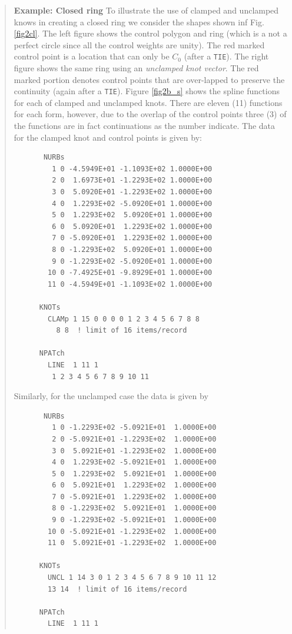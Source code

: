 \begin{quote}
\noindent
\textbf{Example: Closed ring}
To illustrate the use of clamped and unclamped knows in creating a closed
ring we consider the shapes shown inf Fig. \ref{fig2cl}.  The left figure
shows the control polygon and ring (which is a not a perfect circle since all
the control weights are unity). The red marked control point is a location that
can only be $C_0$ (after a \texttt{TIE}).  The right figure shows the same
ring using an \textit{unclamped knot vector}.  The red marked portion denotes
control points that are over-lapped to preserve the continuity (again after
a \texttt{TIE}).
Figure \ref{fig2b_s} shows the spline functions for each of clamped
and unclamped knots.  There are eleven (11) functions for each form, however,
due to the overlap of the control points three (3) of the functions are in
fact continuations as the number indicate.
The data for the clamped knot and control points is given
by:
\setlength{\baselineskip}{12pt}
\begin{verbatim}
       NURBs
         1 0 -4.5949E+01 -1.1093E+02 1.0000E+00
         2 0  1.6973E+01 -1.2293E+02 1.0000E+00
         3 0  5.0920E+01 -1.2293E+02 1.0000E+00
         4 0  1.2293E+02 -5.0920E+01 1.0000E+00
         5 0  1.2293E+02  5.0920E+01 1.0000E+00
         6 0  5.0920E+01  1.2293E+02 1.0000E+00
         7 0 -5.0920E+01  1.2293E+02 1.0000E+00
         8 0 -1.2293E+02  5.0920E+01 1.0000E+00
         9 0 -1.2293E+02 -5.0920E+01 1.0000E+00
        10 0 -7.4925E+01 -9.8929E+01 1.0000E+00
        11 0 -4.5949E+01 -1.1093E+02 1.0000E+00

      KNOTs
        CLAMp 1 15 0 0 0 0 1 2 3 4 5 6 7 8 8
          8 8  ! limit of 16 items/record

      NPATch
        LINE  1 11 1
         1 2 3 4 5 6 7 8 9 10 11
\end{verbatim}
\setlength{\baselineskip}{14pt}
Similarly, for the unclamped case the data is given by
\setlength{\baselineskip}{12pt}
\begin{verbatim}
       NURBs
         1 0 -1.2293E+02 -5.0921E+01  1.0000E+00
         2 0 -5.0921E+01 -1.2293E+02  1.0000E+00
         3 0  5.0921E+01 -1.2293E+02  1.0000E+00
         4 0  1.2293E+02 -5.0921E+01  1.0000E+00
         5 0  1.2293E+02  5.0921E+01  1.0000E+00
         6 0  5.0921E+01  1.2293E+02  1.0000E+00
         7 0 -5.0921E+01  1.2293E+02  1.0000E+00
         8 0 -1.2293E+02  5.0921E+01  1.0000E+00
         9 0 -1.2293E+02 -5.0921E+01  1.0000E+00
        10 0 -5.0921E+01 -1.2293E+02  1.0000E+00
        11 0  5.0921E+01 -1.2293E+02  1.0000E+00

      KNOTs
        UNCL 1 14 3 0 1 2 3 4 5 6 7 8 9 10 11 12
        13 14  ! limit of 16 items/record

      NPATch
        LINE  1 11 1
\end{verbatim}
\setlength{\baselineskip}{14pt}
\end{quote}


